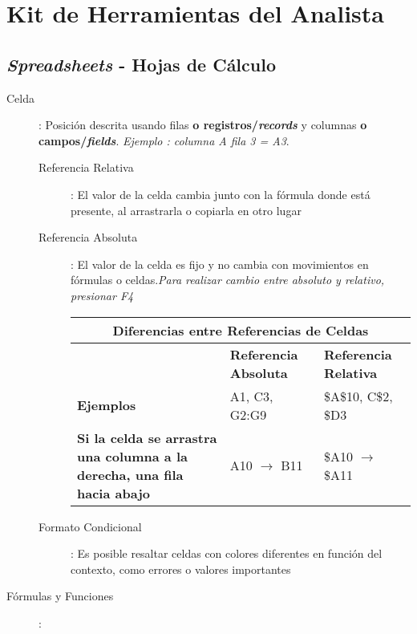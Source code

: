 \section {Kit de Herramientas del Analista}

\subsection{\textit{Spreadsheets} - Hojas de Cálculo}
\begin{description}
    \item[Celda]{ : Posición descrita usando filas \textbf{o registros/\textit{records}} y columnas \textbf{o campos/\textit{fields}}. \textit{Ejemplo : columna A fila 3 = A3}. 
    \begin{description}
        \item[Referencia Relativa]{ : El valor de la celda cambia junto con la fórmula donde está presente, al arrastrarla o copiarla en otro lugar}
        \item[Referencia Absoluta]{ : El valor de la celda es fijo y no cambia con movimientos en fórmulas o celdas.\textit{Para realizar cambio entre absoluto y relativo, presionar F4}}
        \begin{table}
            \centering
            \begin{tabular}{|p{5cm}|p{4.5cm}|p{4.5cm}|}
                \hline
                \multicolumn{3}{|c|}{Diferencias entre Referencias de Celdas} \\
                \hline
                & \textbf{Referencia Absoluta} & \textbf{Referencia Relativa} \\
                \hline
                \textbf{Ejemplos} & A1, C3, G2:G9 & \$A\$10, C\$2, \$D3 \\
                \hline
                \textbf{Si la celda se arrastra una columna a la derecha, una fila hacia abajo} & A10 $\rightarrow$ B11 & \$A10 $\rightarrow$ \$A11 \\
                \hline
            \end{tabular}
        \end{table}
        \item[Formato Condicional]{ : Es posible resaltar celdas con colores diferentes en función del contexto, como errores o valores importantes}
    \end{description}}
    \item[Fórmulas y Funciones]{ : 
    }
\end{description}
